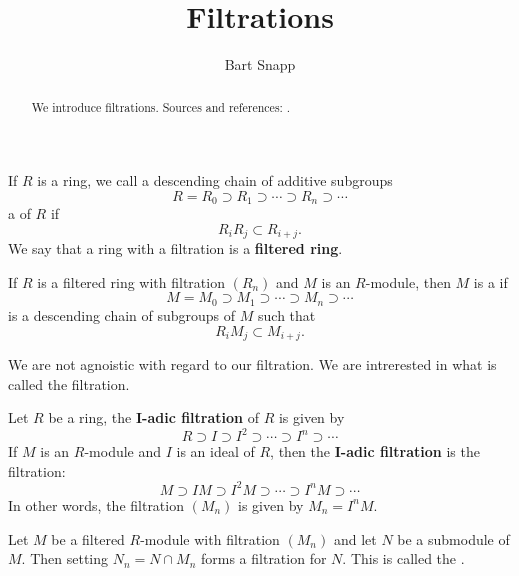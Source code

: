 \documentclass{ximera}
\author{Bart Snapp}
\title{Filtrations}
\begin{document}
\begin{abstract}
  We introduce filtrations. Sources and
  references: \cite{sD2008,jpS2000}.
\end{abstract}
\maketitle



\begin{definition}
  If $R$ is a ring, we call a descending chain of additive subgroups
  \[
  R = R_0 \supset R_1\supset \cdots \supset R_n\supset \cdots
  \]
  a  of $R$ if 
  \[
  R_i R_j \subset R_{i+j}.
  \]
  We say that a ring with a filtration is a \textbf{filtered ring}.
\end{definition}



\begin{definition}
  If $R$ is a filtered ring with filtration $(R_n)$ and $M$ is an
  $R$-module, then $M$ is a  if
  \[
  M = M_0  \supset M_1\supset \cdots \supset M_n\supset \cdots
  \]
  is a descending chain of subgroups of $M$ such that 
  \[
  R_i M_j \subset M_{i+j}.
  \]
\end{definition}


We are not agnoistic with regard to our filtration. We are intrerested
in what is called the  filtration.

\begin{definition}
  Let $R$ be a ring, the \textbf{$\boldsymbol{I}$-adic filtration} of
  $R$ is given by
  \[
  R \supset I \supset I^2 \supset \cdots \supset I^n \supset \cdots
  \]
  If $M$ is an $R$-module and $I$ is an ideal of $R$, then the
  \textbf{$\boldsymbol{I}$-adic filtration} is the filtration:
  \[
  M \supset  I M \supset I^2 M \supset \cdots  \supset  I^n M \supset \cdots 
  \]
In other words, the filtration $(M_n)$ is given by $M_n = I^n M$.
\end{definition}



 
\begin{definition}
  Let $M$ be a filtered $R$-module with filtration $(M_n)$ and let $N$
  be a submodule of $M$. Then setting $N_n= N\cap M_n$ forms a
  filtration for $N$. This is called the .
\end{definition}
\end{document}

